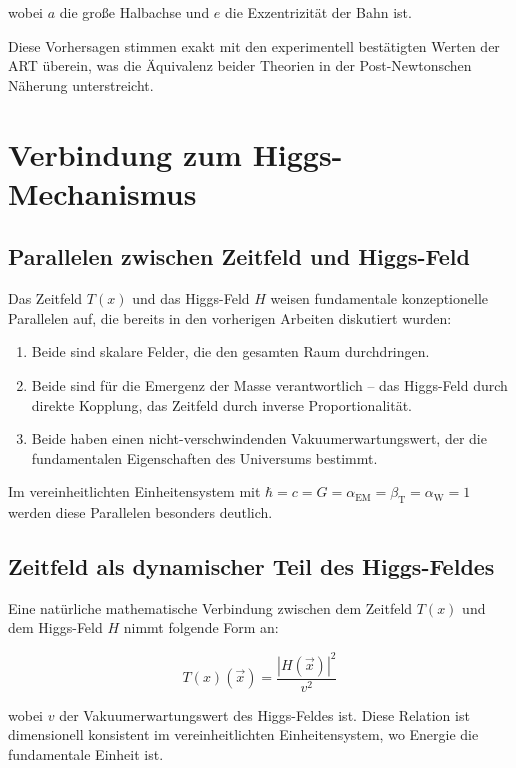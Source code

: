 \documentclass[12pt,a4paper]{article}
\newcommand{\Tfield}{T(x)}
\newcommand{\betaT}{\beta_{\text{T}}}
\newcommand{\alphaEM}{\alpha_{\text{EM}}}
\newcommand{\alphaW}{\alpha_{\text{W}}}
\newcommand{\vecx}{\vec{x}}
\begin{document}
	wobei \(a\) die große Halbachse und \(e\) die Exzentrizität der Bahn ist.
	
	Diese Vorhersagen stimmen exakt mit den experimentell bestätigten Werten der ART überein, was die Äquivalenz beider Theorien in der Post-Newtonschen Näherung unterstreicht.
	
	\section{Verbindung zum Higgs-Mechanismus}
	
	\subsection{Parallelen zwischen Zeitfeld und Higgs-Feld}
	
	Das Zeitfeld \(\Tfield\) und das Higgs-Feld \(H\) weisen fundamentale konzeptionelle Parallelen auf, die bereits in den vorherigen Arbeiten \cite{pascher_alpha_2025, pascher_alphabeta_2025} diskutiert wurden:
	
	\begin{enumerate}
		\item Beide sind skalare Felder, die den gesamten Raum durchdringen.
		\item Beide sind für die Emergenz der Masse verantwortlich – das Higgs-Feld durch direkte Kopplung, das Zeitfeld durch inverse Proportionalität.
		\item Beide haben einen nicht-verschwindenden Vakuumerwartungswert, der die fundamentalen Eigenschaften des Universums bestimmt.
	\end{enumerate}
	
	Im vereinheitlichten Einheitensystem mit \(\hbar = c = G = \alphaEM = \betaT = \alphaW = 1\) werden diese Parallelen besonders deutlich.
	
	\subsection{Zeitfeld als dynamischer Teil des Higgs-Feldes}
	
	Eine natürliche mathematische Verbindung zwischen dem Zeitfeld \(\Tfield\) und dem Higgs-Feld \(H\) nimmt folgende Form an:
	
	\begin{equation}
		\Tfield(\vecx) = \frac{|H(\vecx)|^2}{v^2}
	\end{equation}
	
	wobei \(v\) der Vakuumerwartungswert des Higgs-Feldes ist. Diese Relation ist dimensionell konsistent im vereinheitlichten Einheitensystem, wo Energie die fundamentale Einheit ist.
	
\end{document}
